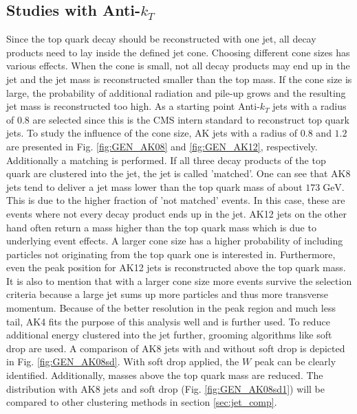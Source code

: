 \FloatBarrier %
\subsection{Studies with Anti-$k_T$}
\label{sec:AK}	
	Since the top quark decay should be reconstructed with one jet, all decay products need to lay inside the defined jet cone. Choosing different cone sizes has various effects. When the cone is small, not all decay products may end up in the jet and the jet mass is reconstructed smaller than the top mass. If the cone size is large, the probability of additional radiation and pile-up grows and the resulting jet mass is reconstructed too high.	As a starting point Anti-$k_T$ jets with a radius of $0.8$ are selected since this is the CMS intern standard to reconstruct top quark jets. To study the influence of the cone size, AK jets with a radius of $0.8$ and $1.2$ are presented in Fig. \ref{fig:GEN_AK08} and \ref{fig:GEN_AK12}, respectively. Additionally a matching is performed. If all three decay products of the top quark are clustered into the jet, the jet is called 'matched'. One can see that AK8 jets tend to deliver a jet mass lower than the top quark mass of about $173\;\text{GeV}$. This is due to the higher fraction of 'not matched' events. In this case, these are events where not every decay product ends up in the jet. AK12 jets on the other hand often return a mass higher than the top quark mass which is due to underlying event effects. A larger cone size has a higher probability of including particles not originating from the top quark one is interested in. Furthermore, even the peak position for AK12 jets is reconstructed above the top quark mass. It is also to mention that with a larger cone size more events survive the selection criteria because a large jet sums up more particles and thus more transverse momentum. Because of the better resolution in the peak region and much less tail, AK4 fits the purpose of this analysis well and is further used. To reduce additional energy clustered into the jet further, grooming algorithms like soft drop are used. A comparison of AK8 jets with and without soft drop is depicted in Fig. \ref{fig:GEN_AK08sd}. With soft drop applied, the $W$ peak can be clearly identified. Additionally, masses above the top quark mass are reduced. The distribution with AK8 jets and soft drop (Fig. \ref{fig:GEN_AK08sd1}) will be compared to other clustering methods in section \ref{sec:jet_comp}.

